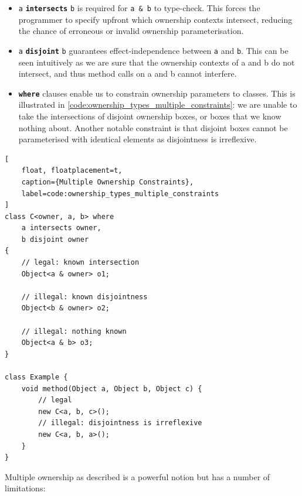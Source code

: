 \documentclass{acm_proc_article-sp}
\begin{document}
\begin{itemize}

    \item \lstinline{a} \textbf{\lstinline|intersects|} \lstinline{b} is
        required for \lstinline|a & b| to type-check. This forces the programmer
        to specify upfront which ownership contexts intersect, reducing the
        chance of erroneous or invalid ownership parameterisation.

    \item \lstinline{a} \textbf{\lstinline|disjoint|} \lstinline{b} guarantees
        effect-independence between \lstinline{a} and \lstinline{b}. This can be
        seen intuitively as we are sure that the ownership contexts of a and b
        do not intersect, and thus method calls on a and b cannot interfere.

    \item \textbf{\lstinline|where|} clauses enable us to constrain ownership
        parameters to classes. This is illustrated in
        \cref{code:ownership_types_multiple_constraints}: we are unable to take
        the intersections of disjoint ownership boxes, or boxes that we know
        nothing about. Another notable constraint is that disjoint boxes cannot
		be parameterised with identical elements as disjointness is irreflexive.

\end{itemize}

\begin{lstlisting}[
	float, floatplacement=t,
	caption={Multiple Ownership Constraints},
	label=code:ownership_types_multiple_constraints
]
class C<owner, a, b> where
	a intersects owner,
	b disjoint owner
{
	// legal: known intersection
	Object<a & owner> o1;

	// illegal: known disjointness
	Object<b & owner> o2;

	// illegal: nothing known
	Object<a & b> o3;
}

class Example {
	void method(Object a, Object b, Object c) {
		// legal
		new C<a, b, c>();
		// illegal: disjointness is irreflexive
		new C<a, b, a>();
	}
}
\end{lstlisting}

Multiple ownership as described is a powerful notion but has a number of
limitations:
\end{document}
